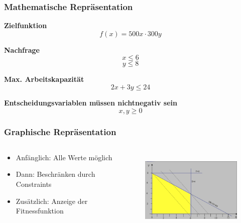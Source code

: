 \documentclass{beamer}
\begin{document}
  \begin{frame}
    \frametitle{Mathematische Repräsentation}

    \textbf{Zielfunktion}
    $$f(x) = 500x \cdot 300y $$
    \pause

    \textbf{Nachfrage}
    $$x \leq 6$$
    $$y \leq 8$$
    \pause

    \textbf{Max. Arbeitskapazität}
    $$2x + 3y \leq 24$$
    \pause

    \textbf{Entscheidungsvariablen müssen nichtnegativ sein}
    $$x, y \geq 0$$
  \end{frame}

  \begin{frame}
    \frametitle{Graphische Repräsentation}
    \begin{columns}[onlytextwidth]
      \begin{column}{0.4\textwidth}
        \begin{itemize}[<+->]
          \item Anfänglich: Alle Werte möglich
          \item Dann: Beschränken durch Constraints
          \item Zusätzlich: Anzeige der Fitnessfunktion
        \end{itemize}
      \end{column}
      \begin{column}{0.6\textwidth}
        \begin{figure}
          \centering
          \includegraphics[width=\linewidth,height=150px,keepaspectratio]{optimization_graphic.png}
        \end{figure}
      \end{column}
    \end{columns}
  \end{frame}
\end{document}

